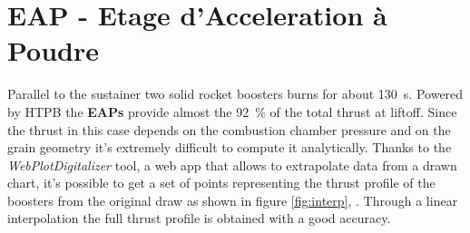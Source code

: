 \documentclass[12pt,fleqn,openany]{book} %
\begin{document}
\section{EAP - Etage d’Acceleration à Poudre}
Parallel to the sustainer two solid rocket boosters burns for about \SI{130}{s}. Powered by HTPB the \textbf{EAPs} provide almost the \SI{92}{\%} of the total thrust at liftoff. Since the thrust in this case depends on the combustion chamber pressure and on the grain geometry it's extremely difficult to compute it analytically. Thanks to the \textit{WebPlotDigitalizer} tool, a web app that allows to extrapolate data from a drawn chart, it's possible to get a set of points representing the thrust profile of the boosters from the original draw as shown in figure \hypertarget{fig:interp}{\ref{fig:interp}}, \cite{bib:8}. Through a linear interpolation the full thrust profile is obtained with a good accuracy.                                     

\end{document}
